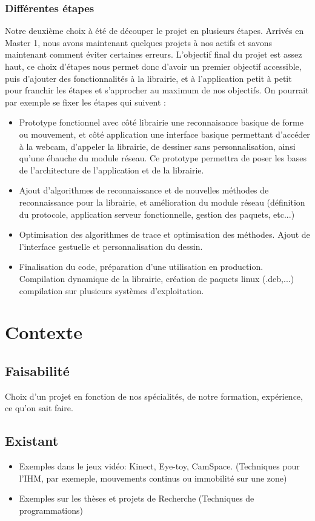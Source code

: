 \documentclass{article}
\begin{document}
				\subsubsection{Différentes étapes}
				Notre deuxième choix à été de découper le projet en plusieurs étapes. Arrivés en Master 1, nous avons maintenant quelques projets à nos actifs et savons maintenant comment éviter certaines erreurs. L'objectif final du projet est assez haut, ce choix d'étapes nous permet donc d'avoir un premier objectif accessible, puis d'ajouter des fonctionnalités à la librairie, et à l'application petit à petit pour franchir les étapes et s'approcher au maximum de nos objectifs. On pourrait par exemple se fixer les étapes qui suivent : \\
				\begin{itemize}
					\item{Prototype fonctionnel avec côté librairie une reconnaisance basique de forme ou mouvement, et côté application une interface basique permettant d'accéder à la webcam, d'appeler la librairie, de dessiner sans personnalisation, ainsi qu'une ébauche du module réseau. Ce prototype permettra de poser les bases de l'architecture de l'application et de la librairie.}
					\item{Ajout d'algorithmes de reconnaissance et de nouvelles méthodes de reconnaissance pour la librairie, et amélioration du module réseau (définition du protocole, application serveur fonctionnelle, gestion des paquets, etc...)}
					\item{Optimisation des algorithmes de trace et optimisation des méthodes. Ajout de l'interface gestuelle et personnalisation du dessin.}
					\item{Finalisation du code, préparation d'une utilisation en production. Compilation dynamique de la librairie, création de paquets linux (.deb,...) compilation sur plusieurs systèmes d'exploitation.}
				\end{itemize}
	\section{Contexte}
		\subsection{Faisabilité}
			Choix d'un projet en fonction de nos spécialités, de notre formation, expérience, ce qu'on sait faire.
		\subsection{Existant}
			\begin{itemize}
			\item Exemples dans le jeux vidéo: Kinect, Eye-toy, CamSpace. (Techniques pour l'IHM, par exemeple, mouvements continus ou immobilité sur une zone)
			\item Exemples sur les thèses et projets de Recherche (Techniques de programmations)
			\end{itemize}
\end{document}
